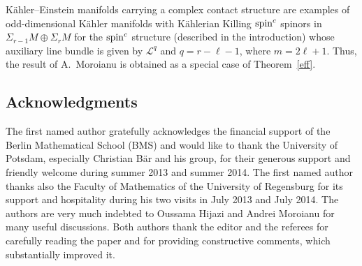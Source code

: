 \documentclass[pdftex]{sigma}
\numberwithin{equation}{section}
\theoremstyle{definition}
\begin{document}
K\"ahler--Einstein manifolds carrying a complex contact structure are examples of odd-di\-men\-sional  K\"ahler manifolds with K\"ahlerian Killing ${\mathop{\rm spin}^c}$ spinors in $\Sigma_{r-1} M \oplus\Sigma_r M $ for the ${\mathop{\rm spin}^c}$ structure (described in the introduction) whose auxiliary line bundle is given by $\mathcal L^q$ and $q = r-\ell-1$, where $m=2\ell+1$. Thus, the result of A.~Moroianu is obtained as a special case of Theorem~\ref{eff}.



\subsection*{Acknowledgments}

The f\/irst named author gratefully acknowledges the f\/inancial support of the Berlin Mathematical
School (BMS) and would like to thank the University of Potsdam, especially
Christian B\"ar and his group, for their generous support and friendly welcome during summer 2013
and summer 2014. The f\/irst named author thanks also the Faculty of Mathematics of the
University of Regensburg  for its support and hospitality during his two visits in July 2013 and July 2014.
The authors are very much indebted to Oussama Hijazi and Andrei Moroianu for many useful discussions. Both authors thank the editor and the referees for carefully reading the paper and for providing constructive comments, which substantially improved it.
\end{document}
